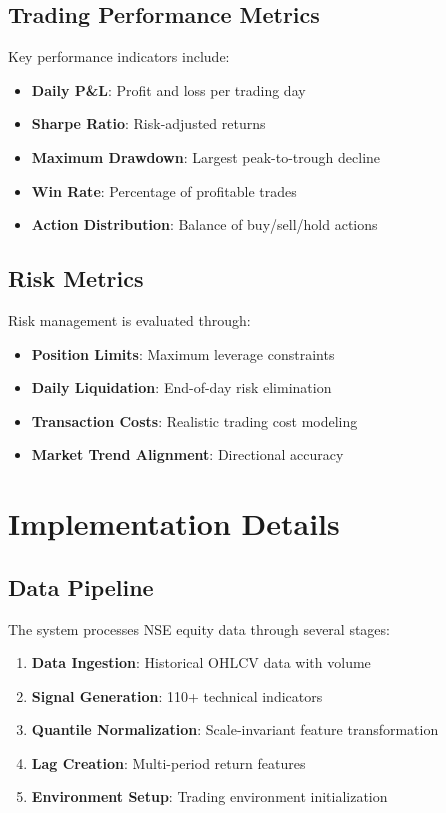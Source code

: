 \documentclass[11pt,a4paper]{article}
\begin{document}
\subsection{Trading Performance Metrics}

Key performance indicators include:

\begin{itemize}
    \item \textbf{Daily P\&L}: Profit and loss per trading day
    \item \textbf{Sharpe Ratio}: Risk-adjusted returns
    \item \textbf{Maximum Drawdown}: Largest peak-to-trough decline
    \item \textbf{Win Rate}: Percentage of profitable trades
    \item \textbf{Action Distribution}: Balance of buy/sell/hold actions
\end{itemize}

\subsection{Risk Metrics}

Risk management is evaluated through:

\begin{itemize}
    \item \textbf{Position Limits}: Maximum leverage constraints
    \item \textbf{Daily Liquidation}: End-of-day risk elimination
    \item \textbf{Transaction Costs}: Realistic trading cost modeling
    \item \textbf{Market Trend Alignment}: Directional accuracy
\end{itemize}

\section{Implementation Details}

\subsection{Data Pipeline}

The system processes NSE equity data through several stages:

\begin{enumerate}
    \item \textbf{Data Ingestion}: Historical OHLCV data with volume
    \item \textbf{Signal Generation}: 110+ technical indicators
    \item \textbf{Quantile Normalization}: Scale-invariant feature transformation
    \item \textbf{Lag Creation}: Multi-period return features
    \item \textbf{Environment Setup}: Trading environment initialization
\end{enumerate}
\end{document}
